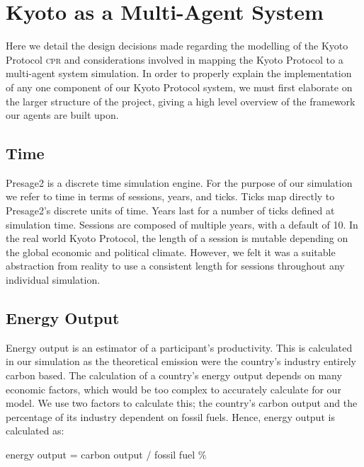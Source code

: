\section{Kyoto as a Multi-Agent System}

Here we detail the design decisions made regarding the modelling of the Kyoto Protocol \textsc{cpr} and considerations involved in mapping the Kyoto Protocol to a multi-agent system simulation. In order to properly explain the implementation of any one component of our Kyoto Protocol system, we must first elaborate on the larger structure of the project, giving a high level overview of the framework our agents are built upon.

\subsection{Time}

Presage2 is a discrete time simulation engine. For the purpose of our simulation we refer to time in terms of sessions, years, and ticks. Ticks map directly to Presage2's discrete units of time. Years last for a number of ticks defined at simulation time. Sessions are composed of multiple years, with a default of 10. In the real world Kyoto Protocol, the length of a session is mutable depending on the global economic and political climate. However, we felt it was a suitable abstraction from reality to use a consistent length for sessions throughout any individual simulation.

\subsection{Energy Output}

Energy output is an estimator of a participant's productivity. This is calculated in our simulation as the theoretical \CO emission were the country's industry entirely carbon based. The calculation of a country's energy output depends on many economic factors, which would be too complex to accurately calculate for our model. We use two factors to calculate this; the country's carbon output and the percentage of its industry dependent on fossil fuels. Hence, energy output is calculated as: 

%
%

\begin{center}
energy output = carbon output / fossil fuel \%
\end{center}

%
%

